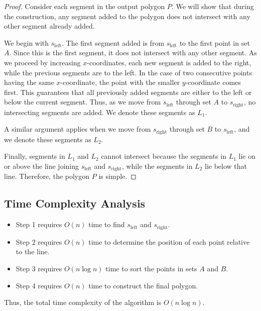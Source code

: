 \documentclass[12pt]{article}
\begin{document}
\begin{proof}
    Consider each segment in the output polygon \(P\). We will show that during the construction, any segment added to the polygon does not intersect with any other segment already added.

    We begin with \(s_{\text{left}}\). The first segment added is from \(s_{\text{left}}\) to the first point in set \(A\). Since this is the first segment, it does not intersect with any other segment. As we proceed by increasing \(x\)-coordinates, each new segment is added to the right, while the previous segments are to the left. In the case of two consecutive points having the same \(x\)-coordinate, the point with the smaller \(y\)-coordinate comes first. This guarantees that all previously added segments are either to the left or below the current segment. Thus, as we move from \(s_{\text{left}}\) through set \(A\) to \(s_{\text{right}}\), no intersecting segments are added. We denote these segments as \(L_{1}\).
    
    A similar argument applies when we move from \(s_{\text{right}}\) through set \(B\) to \(s_{\text{left}}\), and we denote these segments as \(L_{2}\).
    
    Finally, segments in \(L_{1}\) and \(L_{2}\) cannot intersect because the segments in \(L_{1}\) lie on or above the line joining \(s_{\text{left}}\) and \(s_{\text{right}}\), while the segments in \(L_{2}\) lie below that line. Therefore, the polygon \(P\) is simple.
\end{proof}

\subsection*{Time Complexity Analysis}
\begin{itemize}
    \item Step 1 requires \(O(n)\) time to find \(s_{\text{left}}\) and \(s_{\text{right}}\).
    \item Step 2 requires \(O(n)\) time to determine the position of each point relative to the line.
    \item Step 3 requires \(O(n \log n)\) time to sort the points in sets \(A\) and \(B\).
    \item Step 4 requires \(O(n)\) time to construct the final polygon.
\end{itemize}

Thus, the total time complexity of the algorithm is \(O(n \log n)\).
\end{document}
